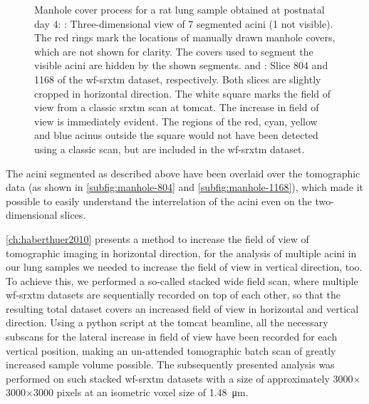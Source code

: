 \begin{figure}
{{%
			\label{subfig:manhole-1168}%
		}%
	}%
	\caption[Manhole cover process]{Manhole cover process for a rat lung sample obtained at postnatal day 4: : Three-dimensional view of 7 segmented acini (1 not visible). The red rings mark the locations of manually drawn manhole covers, which are not shown for clarity. The covers used to segment the visible acini are hidden by the shown segments.  and : Slice 804 and 1168 of the \ac{wf-srxtm} dataset, respectively. Both slices are slightly cropped in horizontal direction. The white square marks the field of view from a classic \ac{srxtm} scan at \ac{tomcat}. The increase in field of view is immediately evident. The regions of the red, cyan, yellow and blue acinus outside the square would not have been detected using a classic scan, but are included in the \ac{wf-srxtm} dataset.}
	\label{fig:manhole cover}%
\end{figure}%

The acini segmented as described above have been overlaid over the tomographic data (as shown in \autoref{subfig:manhole-804} and \ref{subfig:manhole-1168}), which made it possible to easily understand the interrelation of the acini even on the two-dimensional slices. 

\autoref{ch:haberthuer2010} presents a method to increase the field of view of tomographic imaging in horizontal direction, for the analysis of multiple acini in our lung samples we needed to increase the field of view in vertical direction, too. To achieve this, we performed a so-called stacked wide field scan, where multiple \ac{wf-srxtm} datasets are sequentially recorded on top of each other, so that the resulting total dataset covers an increased field of view in horizontal and vertical direction. Using a python script at the \ac{tomcat} beamline, all the necessary subscans for the lateral increase in field of view have been recorded for each vertical position, making an un-attended tomographic batch scan of greatly increased sample volume possible. The subsequently presented analysis was performed on such stacked \ac{wf-srxtm} datasets with a size of approximately 3000$\times$3000$\times$3000 pixels at an isometric voxel size of \SI{1.48}{\micro\meter}.

